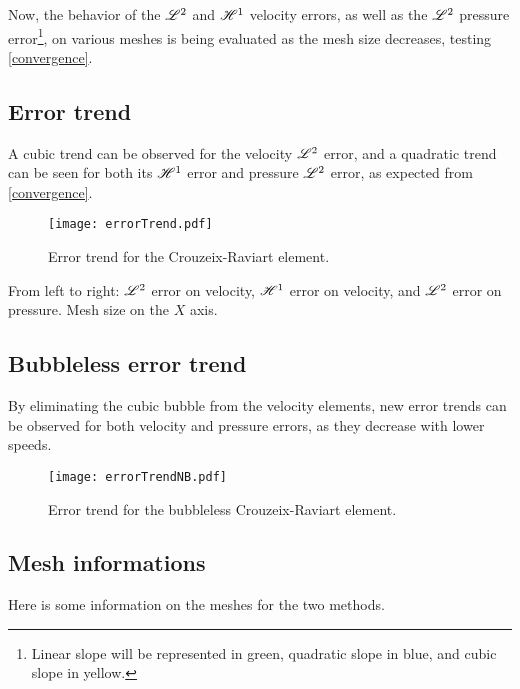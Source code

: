 Now, the behavior of the $\mathscr{L}^2$ and $\mathscr{H}^1$ velocity errors, as well as the $\mathscr{L}^2$ pressure error\footnote{Linear slope will be represented in \textcolor{solarized-green}{green}, quadratic slope in \textcolor{solarized-blue}{blue}, and cubic slope in \textcolor{solarized-yellow}{yellow}.}, on various meshes is being evaluated as the mesh size decreases, testing \ref{convergence}.

\subsection{Error trend}

A cubic trend can be observed for the velocity $\mathscr{L}^2$ error, and a quadratic trend can be seen for both its $\mathscr{H}^1$ error and pressure $\mathscr{L}^2$ error, as expected from \ref{convergence}.

\begin{figure}[!ht]
	\centering
	\texttt{[image: errorTrend.pdf]}
	\caption{Error trend for the Crouzeix-Raviart element.}
\end{figure}

From left to right: $\mathscr{L}^2$ error on velocity, $\mathscr{H}^1$ error on velocity, and $\mathscr{L}^2$ error on pressure. Mesh size on the $X$ axis.

\newpage
\subsection{Bubbleless error trend}

By eliminating the cubic bubble from the velocity elements, new error trends can be observed for both velocity and pressure errors, as they decrease with lower speeds.

\begin{figure}[!ht]
	\centering
	\texttt{[image: errorTrendNB.pdf]}
	\caption{Error trend for the bubbleless Crouzeix-Raviart element.}
\end{figure}

\newpage
\subsection{Mesh informations}

Here is some information on the meshes for the two methods.

\begin{multicols}{2}
	
	
\end{multicols}

